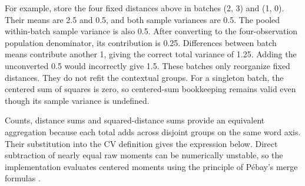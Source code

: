 \documentclass[10pt,letterpaper]{article}
\begin{document}
For example, store the four fixed distances above in batches (2, 3) and (1, 0). Their means are 2.5 and 0.5, and both sample variances are 0.5. The pooled within-batch sample variance is also 0.5. After converting to the four-observation population denominator, its contribution is 0.25. Differences between batch means contribute another 1, giving the correct total variance of 1.25. Adding the unconverted 0.5 would incorrectly give 1.5. These batches only reorganize fixed distances. They do not refit the contextual groups. For a singleton batch, the centered sum of squares is zero, so centered-sum bookkeeping remains valid even though its sample variance is undefined.\par

Counts, distance sums and squared-distance sums provide an equivalent aggregation because each total adds across disjoint groups on the same word axis. Their substitution into the CV definition gives the expression below. Direct subtraction of nearly equal raw moments can be numerically unstable, so the implementation evaluates centered moments using the principle of Pébay's merge formulas \cite{pebay}.\par
\end{document}

